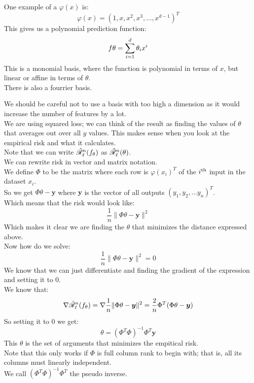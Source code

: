 \documentclass[12pt]{article}
\begin{document}
One example of a $\varphi(x)$ is:
\[ \varphi(x) = (1, x, x^2, x^3, \dots, x^{d-1})^T \]
This gives us a polynomial prediction function:
\[ f\theta = \sum_{i=1}^{d}\theta_i x^i \]
This is a monomial basis, where the function
is polynomial in terms of $x$,
but linear or affine in terms of $\theta$. \\

There is also a fourrier basis.

We should be careful not to use a basis with too
high a dimension as it would increase the number
of features by a lot. \\

We are using squared loss; we can think
of the result as finding the values of $\theta$
that averages out over all $y$ values.
This makes sense when you look at the
empirical risk and what it calculates. \\

Note that we can write $\hat{\mathscr{R}}_{\ell}^{n}
(f_\theta)$ as $\hat{\mathscr{R}}_{\ell}^{n}
(\theta)$. \\

We can rewrite risk in vector and matrix
notation. \\
We define $\Phi$ to be the matrix
where each row is $\varphi(x_i)^T$
of the $i^{\text{th}}$ input in the dataset $x_i$. \\
So we get $\Phi \theta - \boldsymbol{y}$
where $\boldsymbol{y}$ is the vector of all
outputs $(y_1, y_2, \dots y_n)^T$. \\
Which means that the risk would look like:
\[ \dfrac{1}{n}\|\Phi \theta - \boldsymbol{y}\|^2 \]
Which makes it clear we are finding the $\theta$
that minimizes the distance expressed above. \\

Now how do we solve:
\[ \dfrac{1}{n}\|\Phi \theta - \boldsymbol{y}\|^2 = 0 \]
We know that we can just differentiate and finding
the gradient of the expression and setting
it to $0$. \\
We know that:
\[ \nabla \hat{\mathscr{R}}_{\ell}^{n}(f_{\theta}) 
= \nabla \dfrac{1}{n}
\|\Phi \theta - \boldsymbol{y}\|^2 
= \dfrac{2}{n}\Phi^T(\Phi \theta - \boldsymbol{y}) \]
So setting it to $0$ we get:
\[ \theta = (\Phi^T\Phi)^{-1} \Phi^T 
\boldsymbol{y} \]
This $\theta$ is the set of arguments
that minimizes the empitical risk. \\
Note that this only works if $\Phi$
is full column rank to begin with;
that is, all its columns must linearly
independent. \\
We call $(\Phi^T\Phi)^{-1} \Phi^T$
the pseudo inverse. \\
\end{document}
